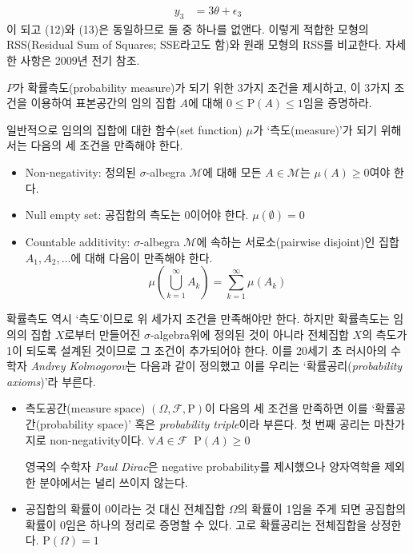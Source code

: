 \documentclass[answers]{exam}
\begin{document}
\begin{questions}
\begin{solution}
\begin{enumerate}[(a)]
\begin{align}
        y_{3} &= 3\theta+\epsilon_{3}
      \end{align}
      이 되고 (12)와 (13)은 동일하므로 둘 중 하나를 없앤다. 이렇게 적합한 모형의 RSS(Residual Sum of Squares; SSE라고도 함)와 원래 모형의 RSS를 비교한다. 자세한 사항은 2009년 전기 참조.
    \end{enumerate}
   \end{solution}
   \question
   $P$가 확률측도(probability measure)가 되기 위한 3가지 조건을 제시하고, 이 3가지 조건을 이용하여 표본공간의 임의 집합 $A$에 대해 $0\leq \mathrm{P}\left(A\right) \leq 1$임을 증명하라.
   \begin{solution}
    일반적으로 임의의 집합에 대한 함수(set function) $\mu$가 `측도(measure)'가 되기 위해서는 다음의 세 조건을 만족해야 한다.
    \begin{itemize}
      \item Non-negativity: 정의된 $\sigma$-albegra $\mathcal{M}$에 대해 모든 $A\in\mathcal{M}$는 $\mu\left(A\right)\geq 0$여야 한다.
      \item Null empty set: 공집합의 측도는 0이어야 한다. $\mu\left(\emptyset\right)=0$
      \item Countable additivity: $\sigma$-albegra $\mathcal{M}$에 속하는 서로소(pairwise disjoint)인 집합 $A_{1},A_{2},\ldots$에 대해 다음이 만족해야 한다.
      \begin{equation}
        \mu\left(\bigcup_{k=1}^{\infty}A_{k}\right) = \sum_{k=1}^{\infty}\mu\left(A_{k}\right)
      \end{equation}
    \end{itemize}
    확률측도 역시 `측도'이므로 위 세가지 조건을 만족해야만 한다. 하지만 확률측도는 임의의 집합 $X$로부터 만들어진 $\sigma$-algebra위에 정의된 것이 아니라 전체집합 $X$의 측도가 1이 되도록 설계된 것이므로 그 조건이 추가되어야 한다. 이를 20세기 초 러시아의 수학자 \emph{Andrey Kolmogorov}는 다음과 같이 정의했고 이를 우리는 `확률공리(\emph{probability axioms})'라 부른다.
      \begin{itemize}
        \item 측도공간(measure space) $\left(\Omega, \mathcal{F},\mathrm{P}\right)$이 다음의 세 조건을 만족하면 이를 `확률공간(probability space)' 혹은 \emph{probability triple}이라 부른다. 첫 번째 공리는 마찬가지로 non-negativity이다. $\forall A\in \mathcal{F}\;\; \mathrm{P}\left(A\right)\geq 0$\par
        영국의 수학자 \emph{Paul Dirac}은 negative probability를 제시했으나 양자역학을 제외한 분야에서는 널리 쓰이지 않는다.
        \item 공집합의 확률이 0이라는 것 대신 전체집합 $\Omega$의 확률이 1임을 주게 되면 공집합의 확률이 0임은 하나의 정리로 증명할 수 있다. 고로 확률공리는 전체집합을 상정한다. $\mathrm{P}\left(\Omega\right)=1$

\end{itemize}
\end{solution}
\end{questions}
\end{document}
